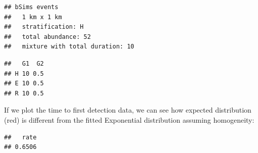 \documentclass[12pt,]{book}
\newenvironment{Shaded}{\begin{snugshade}}{\end{snugshade}}
\newcommand{\DataTypeTok}[1]{\textcolor[rgb]{0.13,0.29,0.53}{#1}}
\newcommand{\KeywordTok}[1]{\textcolor[rgb]{0.13,0.29,0.53}{\textbf{#1}}}
\newcommand{\NormalTok}[1]{#1}
\newcommand{\OperatorTok}[1]{\textcolor[rgb]{0.81,0.36,0.00}{\textbf{#1}}}
\newcommand{\OtherTok}[1]{\textcolor[rgb]{0.56,0.35,0.01}{#1}}
\newcommand{\StringTok}[1]{\textcolor[rgb]{0.31,0.60,0.02}{#1}}
\begin{document}
\begin{verbatim}
## bSims events
##   1 km x 1 km
##   stratification: H
##   total abundance: 52
##   mixture with total duration: 10
\end{verbatim}

\begin{Shaded}
\end{Shaded}

\begin{verbatim}
##   G1  G2
## H 10 0.5
## E 10 0.5
## R 10 0.5
\end{verbatim}

If we plot the time to first detection data, we can see how
expected distribution (red) is different from the fitted
Exponential distribution assuming homogeneity:

\begin{Shaded}
\end{Shaded}

\begin{verbatim}
##   rate 
## 0.6506
\end{verbatim}
\end{document}
